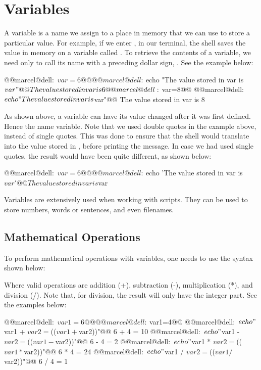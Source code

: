 \section{Variables}

A variable is a name we assign to a place in memory that we can use to store a particular value. For example, if we enter , in our terminal, the shell saves the value  in memory on a variable called . To retrieve the contents of a variable, we need only to call its name with a preceding dollar sign, \mycommand{\$}. See the example below:

\begin{command_line}[Make]
@@marcel@dell:~$var=6@@
@@marcel@dell:~$echo "The value stored in var is $var"@@
The value stored in var is 6
@@marcel@dell:~$var=8@@
@@marcel@dell:~$echo "The value stored in var is $var"@@
The value stored in var is 8
\end{command_line}

As shown above, a variable can have its value changed after it was first defined. Hence the name variable. Note that we used double quotes in the example above, instead of single quotes. This was done to ensure that the shell would translate  into the value stored in , before printing the message. In case we had used single quotes, the result would have been quite different, as shown below:

\begin{command_line}[Make]
@@marcel@dell:~$var=6@@
@@marcel@dell:~$echo 'The value stored in var is $var'@@
The value stored in var is $var
\end{command_line}

Variables are extensively used when working with scripts. They can be used to store numbers, words or sentences, and even filenames.

\subsection{Mathematical Operations}

To perform mathematical operations with variables, one needs to use the syntax shown below:
Where valid operations are addition (+), subtraction (-), multiplication (*), and division (/). Note that, for division, the result will only have the integer part. See the examples below:
\begin{command_line}
@@marcel@dell:~$var1=6@@
@@marcel@dell:~$var1=4@@
@@marcel@dell:~$echo "$var1 + $var2 = $(($var1+$var2))"@@
6 + 4 = 10
@@marcel@dell:~$echo "$var1 - $var2 = $(($var1-$var2))"@@
6 - 4 = 2
@@marcel@dell:~$echo "$var1 * $var2 = $(($var1*$var2))"@@
6 * 4 = 24
@@marcel@dell:~$echo "$var1 / $var2 = $(($var1/$var2))"@@
6 / 4 = 1
\end{command_line}

